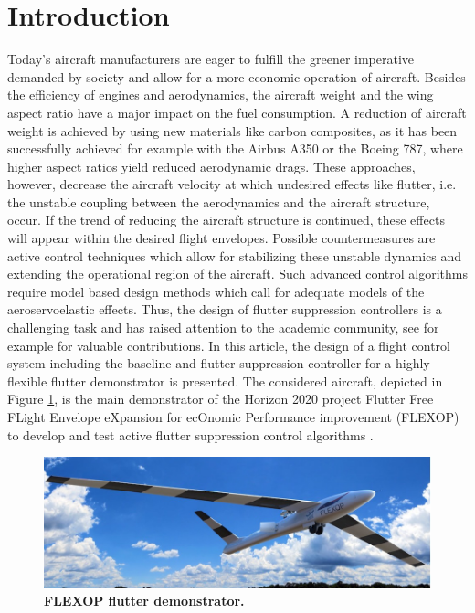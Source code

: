 \documentclass[aerospace,article,submit,moreauthors,pdftex,10pt,a4paper]{Definitions/mdpi}
\begin{document}


\section{Introduction}
Today's aircraft manufacturers are eager to fulfill the greener imperative demanded by society and allow for a more economic operation of aircraft. Besides the efficiency of engines and aerodynamics, the aircraft weight and the wing aspect ratio have a major impact on the fuel consumption. A reduction of aircraft weight is achieved by using new materials like carbon composites, as it has been successfully achieved for example with the Airbus A350 or the Boeing 787, where higher aspect ratios yield reduced aerodynamic drags. These  approaches, however, decrease the aircraft velocity at which undesired effects like flutter, i.e. the unstable coupling between the aerodynamics and the aircraft structure, occur. If the trend of reducing the aircraft structure is continued, these effects will appear within the desired flight envelopes.  Possible countermeasures are active control techniques which allow for stabilizing these unstable dynamics and extending the operational region of the aircraft. 
Such advanced control algorithms require model based design methods which call for adequate models of the aeroservoelastic effects. Thus, the design of flutter suppression controllers is a challenging task and has raised attention to the academic community, see for example \cite{Theis16,Danowsky17,Danowsky18} for valuable contributions. In this article, the design of a flight control system including the baseline and flutter suppression controller for a highly flexible flutter demonstrator is presented. The considered aircraft, depicted in Figure \ref{fig:ac}, is the main demonstrator of the Horizon 2020 project Flutter Free FLight Envelope eXpansion for ecOnomic Performance improvement (FLEXOP) to develop and test active flutter suppression control algorithms \cite{Stahl17,Roessler19}.
\begin{figure}
	\centering
	\includegraphics[width=1\linewidth]{figs/ac.jpg}
	\caption{\textbf{FLEXOP flutter demonstrator.}}
	\label{fig:ac}
\end{figure}
\end{document}

